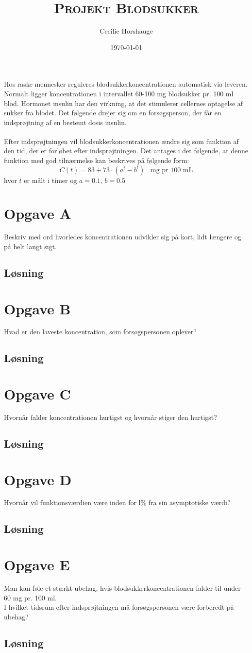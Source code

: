 \documentclass[a4paper, 11pt]{article}
\title{{\large \textsc{Projekt Blodsukker}}}
\author{Cecilie Horshauge}
\date{\today}
\begin{document}
\maketitle
\noindent Hos raske mennesker reguleres blodsukkerkoncentrationen automatisk via leveren. 
Normalt ligger koncentrationen i intervallet 60-100 mg blodsukker pr. 100 ml blod. 
Hormonet insulin har den virkning, at det stimulerer cellernes optagelse af sukker fra blodet. 
Det følgende drejer sig om en forsøgsperson, der får en indsprøjtning af en bestemt dosis insulin.\\\\
Efter indsprøjtningen vil blodsukkerkoncentrationen ændre sig som funktion af den tid,
der er forløbet efter indsprøjtningen. Det antages i det følgende, at denne funktion med god tilnærmelse kan beskrives på følgende form: 
\[C(t)=83+73\cdot (a^t-b^t) \;\;\; \text{mg pr 100 mL}\]
hvor \(t\) er målt i timer og \(a=0.1\), \(b=0.5\)

\section*{Opgave A} 
Beskriv med ord hvorledes koncentrationen udvikler sig på kort, lidt længere og på helt langt sigt.

\subsection*{Løsning}

\section*{Opgave B} 
Hvad er den laveste koncentration, som forsøgspersonen oplever?
\subsection*{Løsning}

\section*{Opgave C} 
Hvornår falder koncentrationen hurtigst og hvornår stiger den hurtigst?
\subsection*{Løsning}

\section*{Opgave D} 
Hvornår vil funktionsværdien være inden for l\% fra sin asymptotiske værdi?
\subsection*{Løsning}

\section*{Opgave E} 
Man kan føle et stærkt ubehag, hvis blodsukkerkoncentrationen falder til under 60 mg pr. 100 ml. \\
I hvilket tidsrum efter indsprøjtningen må forsøgspersonen være forberedt på ubehag?
\subsection*{Løsning}
\end{document}
